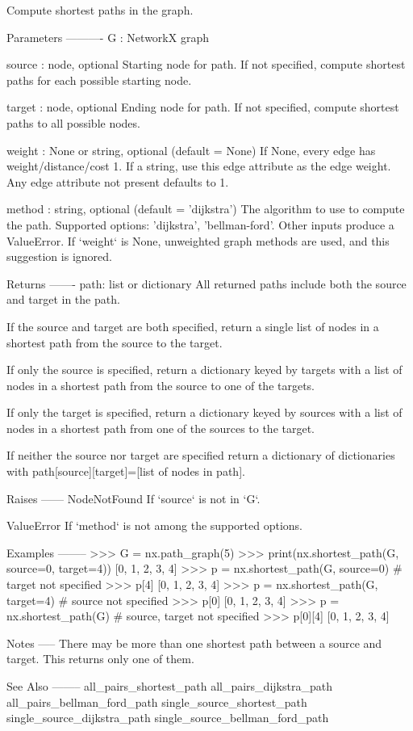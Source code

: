 \begin{DoxyVerb}Compute shortest paths in the graph.

Parameters
----------
G : NetworkX graph

source : node, optional
    Starting node for path. If not specified, compute shortest
    paths for each possible starting node.

target : node, optional
    Ending node for path. If not specified, compute shortest
    paths to all possible nodes.

weight : None or string, optional (default = None)
    If None, every edge has weight/distance/cost 1.
    If a string, use this edge attribute as the edge weight.
    Any edge attribute not present defaults to 1.

method : string, optional (default = 'dijkstra')
    The algorithm to use to compute the path.
    Supported options: 'dijkstra', 'bellman-ford'.
    Other inputs produce a ValueError.
    If `weight` is None, unweighted graph methods are used, and this
    suggestion is ignored.

Returns
-------
path: list or dictionary
    All returned paths include both the source and target in the path.

    If the source and target are both specified, return a single list
    of nodes in a shortest path from the source to the target.

    If only the source is specified, return a dictionary keyed by
    targets with a list of nodes in a shortest path from the source
    to one of the targets.

    If only the target is specified, return a dictionary keyed by
    sources with a list of nodes in a shortest path from one of the
    sources to the target.

    If neither the source nor target are specified return a dictionary
    of dictionaries with path[source][target]=[list of nodes in path].

Raises
------
NodeNotFound
    If `source` is not in `G`.

ValueError
    If `method` is not among the supported options.

Examples
--------
>>> G = nx.path_graph(5)
>>> print(nx.shortest_path(G, source=0, target=4))
[0, 1, 2, 3, 4]
>>> p = nx.shortest_path(G, source=0)  # target not specified
>>> p[4]
[0, 1, 2, 3, 4]
>>> p = nx.shortest_path(G, target=4)  # source not specified
>>> p[0]
[0, 1, 2, 3, 4]
>>> p = nx.shortest_path(G)  # source, target not specified
>>> p[0][4]
[0, 1, 2, 3, 4]

Notes
-----
There may be more than one shortest path between a source and target.
This returns only one of them.

See Also
--------
all_pairs_shortest_path
all_pairs_dijkstra_path
all_pairs_bellman_ford_path
single_source_shortest_path
single_source_dijkstra_path
single_source_bellman_ford_path
\end{DoxyVerb}
